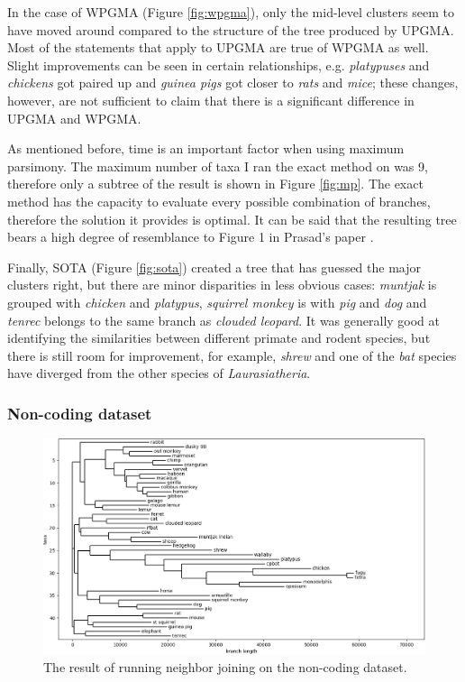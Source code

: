 \documentclass[11pt,twocolumn]{article}
\begin{document}
In the case of WPGMA (Figure \ref{fig:wpgma}), only the mid-level clusters seem to have moved around compared to the structure of the tree produced by UPGMA. Most of the statements that apply to UPGMA are true of WPGMA as well. Slight improvements can be seen in certain relationships, e.g. \textit{platypuses} and \textit{chickens} got paired up and \textit{guinea pigs} got closer to \textit{rats} and \textit{mice}; these changes, however, are not sufficient to claim that there is a significant difference in UPGMA and WPGMA.

As mentioned before, time is an important factor when using maximum parsimony. The maximum number of taxa I ran the exact method on was 9, therefore only a subtree of the result is shown in Figure \ref{fig:mp}. The exact method has the capacity to evaluate every possible combination of branches, therefore the solution it provides is optimal. It can be said that the resulting tree bears a high degree of resemblance to Figure 1 in Prasad's paper \cite{Prasad2008}.

Finally, SOTA (Figure \ref{fig:sota}) created a tree that has guessed the major clusters right, but there are minor disparities in less obvious cases: \textit{muntjak} is grouped with \textit{chicken} and \textit{platypus}, \textit{squirrel monkey} is with \textit{pig} and \textit{dog} and \textit{tenrec} belongs to the same branch as \textit{clouded leopard}. It was generally good at identifying the similarities between different primate and rodent species, but there is still room for improvement, for example, \textit{shrew} and one of the \textit{bat} species have diverged from the other species of \textit{Laurasiatheria}.

\subsubsection{Non-coding dataset}

\begin{figure}
    \centering
    \includegraphics[width=\linewidth]{img/nj_noncoding.png}
    \caption{The result of running neighbor joining on the non-coding dataset.}
    \label{fig:nj_noncoding}
\end{figure}
\end{document}
